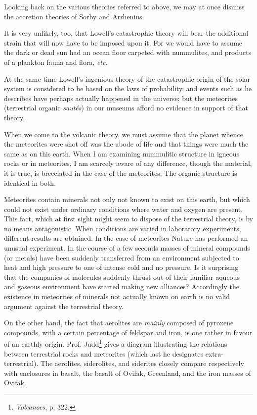 \documentclass[a4paper, 12pt, oneside]{article}
\begin{document}
Looking back on the various theories referred to above, we may at once dismiss the accretion theories of Sorby and Arrhenius.

It is very unlikely, too, that Lowell's catastrophic theory will bear the additional strain that will now have to be imposed upon it. For we would have to assume the dark or dead sun had an ocean floor carpeted with nummulites, and products of a plankton fauna and flora, \emph{etc.}

At the same time Lowell's ingenious theory of the catastrophic origin of the solar system is considered to be based on the laws of probability, and events such as he describes have perhaps actually happened in the universe; but the meteorites (terrestrial organic \emph{sautés}) in our museums afford no evidence in support of that theory.

When we come to the volcanic theory, we must assume that the planet whence the meteorites were shot off was the abode of life and that things were much the same as on this earth. When I am examining nummulitic structure in igneous rocks or in meteorites, I am scarcely aware of any difference, though the material, it is true, is brecciated in the case of the meteorites. The organic structure is identical in both.

Meteorites contain minerals not only not known to exist on this earth, but which could not exist under ordinary conditions where water and oxygen are present. This fact, which at first sight might seem to dispose of the terrestrial theory, is by no means antagonistic. When conditions are varied in laboratory experiments, different results are obtained. In the case of meteorites Nature has performed an unusual experiment. In the course of a few seconds masses of mineral compounds (or metals) have been suddenly transferred from an environment subjected to heat and high pressure to one of intense cold and no pressure. Is it surprising that the companies of molecules suddenly thrust out of their familiar aqueous and gaseous environment have started making new alliances? Accordingly the existence in meteorites of minerals not actually known on earth is no valid argument against the terrestrial theory.

On the other hand, the fact that aerolites are \emph{mainly} composed of pyroxene compounds, with a certain percentage of feldspar and iron, is one rather in favour of an earthly origin. Prof. Judd\footnote{\emph{Volcanoes}, p. 322.} gives a diagram illustrating the relations between terrestrial rocks and meteorites (which last he designates extra-terrestrial). The aerolites, siderolites, and siderites closely compare respectively with enclosures in basalt, the basalt of Ovifak, Greenland, and the iron masses of Ovifak.
\end{document}

